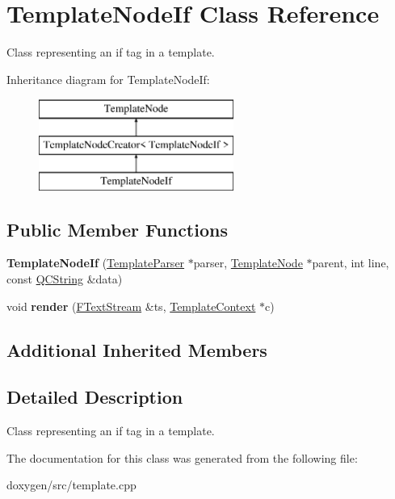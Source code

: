 \hypertarget{class_template_node_if}{}\section{Template\+Node\+If Class Reference}
\label{class_template_node_if}


Class representing an \textquotesingle{}if\textquotesingle{} tag in a template.  


Inheritance diagram for Template\+Node\+If\+:\begin{figure}[H]
\begin{center}
\leavevmode
\includegraphics[height=3.000000cm]{class_template_node_if}
\end{center}
\end{figure}
\subsection*{Public Member Functions}
\begin{DoxyCompactItemize}
\item 
\mbox{\label{class_template_node_if_acfd56d480c2f1fcb8dceeb102de8e6c4}} 
{\bfseries Template\+Node\+If} (\mbox{\hyperlink{class_template_parser}{Template\+Parser}} $\ast$parser, \mbox{\hyperlink{class_template_node}{Template\+Node}} $\ast$parent, int line, const \mbox{\hyperlink{class_q_c_string}{Q\+C\+String}} \&data)
\item 
\mbox{\label{class_template_node_if_a46c83e893905d8ad57df4cd9a76ada42}} 
void {\bfseries render} (\mbox{\hyperlink{class_f_text_stream}{F\+Text\+Stream}} \&ts, \mbox{\hyperlink{class_template_context}{Template\+Context}} $\ast$c)
\end{DoxyCompactItemize}
\subsection*{Additional Inherited Members}


\subsection{Detailed Description}
Class representing an \textquotesingle{}if\textquotesingle{} tag in a template. 

The documentation for this class was generated from the following file\+:\begin{DoxyCompactItemize}
\item 
doxygen/src/template.\+cpp\end{DoxyCompactItemize}

